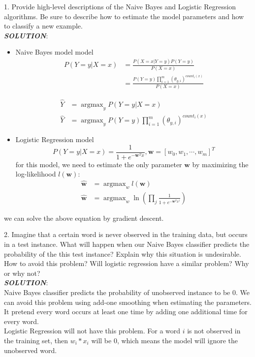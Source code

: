 \documentclass{article}
\DeclareMathOperator*{\argmax}{argmax}
\theoremstyle{definition}
\theoremstyle{definition}
\theoremstyle{remark}
\begin{document}
1. Provide high-level descriptions of the Naive Bayes and Logistic Regression algorithms. Be
sure to describe how to estimate the model parameters and how to classify a new example.\\
\emph{\textbf{SOLUTION}}:\\
\begin{itemize}
\item Naive Bayes model  model
\begin{equation}\nonumber
\begin{aligned}
P(Y=y|X=x)&=\frac{P(X=x|Y=y)P(Y=y)}{P(X=x)}\\
&=\frac{P(Y=y)\prod_{i=1}^m (\theta_{y,i})^{count_i(x)}}{P(X=x)}
\end{aligned}
\end{equation}

\begin{equation}\nonumber
\begin{aligned}
\hat{Y}&=\mathop{\argmax}_{y} P(Y=y|X=x)\\
\hat{Y}&=\mathop{\argmax}_{y} P(Y=y)\prod_{i=1}^m (\theta_{y,i})^{count_i(x)}
\end{aligned}
\end{equation}

\item Logistic Regression model \[P(Y=y|X=x)=\frac{1}{1+e^{-\mathbf{w}^Tx}}, \mathbf{w}=[w_0,w_1,\cdots,w_m]^T\]
for this model, we need to estimate the only parameter $\mathbf{w}$ by maximizing the log-likelihood $l(\mathbf{w})$:
\begin{equation}\nonumber
\begin{aligned}
\hat{\mathbf{w}}&=\mathop{\argmax}_{w} l(\mathbf{w})\\
\hat{\mathbf{w}}&=\mathop{\argmax}_{w} \ln(\prod_j \frac{1}{1+e^{-\mathbf{w}^Tx^j}})
\end{aligned}
\end{equation}
\end{itemize}
we can solve the above equation by gradient descent.

2. Imagine that a certain word is never observed in the training data, but occurs in a test
instance. What will happen when our Naive Bayes classifier predicts the probability of the this test
instance? Explain why this situation is undesirable. How to avoid this problem? Will logistic regression have a similar problem?
Why or why not?\\
\emph{\textbf{SOLUTION}}:\\
Naive Bayes classifier predicts the probability of unobserved instance to be 0. We can avoid this problem using add-one
smoothing when estimating the parameters. It pretend every word occurs at least one time by adding one additional time
for every word.\\
Logistic Regression will not have this problem. For a word $i$ is not observed in the training set, then $w_i*x_i$ will be 0,
which means the model will ignore the unobserved word.
\end{document}
